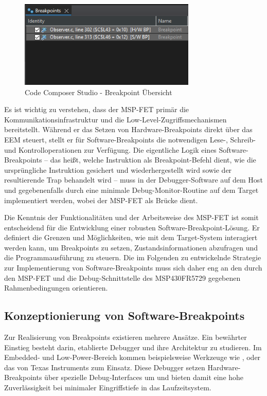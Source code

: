 \begin{figure}[h!]
	\centering
	\includegraphics[width=0.75\textwidth]{../Bilder/HW_SW_Breakpoint.png}
	\caption{Code Composer Studio - Breakpoint \"Ubersicht}
	\label{fig:CCS_SetBR}
\end{figure}

Es ist wichtig zu verstehen, dass der MSP-FET prim\"ar die Kommunikationsinfrastruktur und die Low-Level-Zugriffsmechanismen bereitstellt. W\"ahrend er das Setzen von Hardware-Breakpoints direkt \"uber das EEM steuert, stellt er f\"ur Software-Breakpoints die notwendigen Lese-, Schreib- und Kontrolloperationen zur Verf\"ugung. Die eigentliche Logik eines Software-Breakpoints – das hei{\ss}t, welche Instruktion als Breakpoint-Befehl dient, wie die urspr\"ungliche Instruktion gesichert und wiederhergestellt wird sowie der resultierende Trap behandelt wird – muss in der Debugger-Software auf dem Host und gegebenenfalls durch eine minimale Debug-Monitor-Routine auf dem Target implementiert werden, wobei der MSP-FET als Br\"ucke dient. 

Die Kenntnis der Funktionalit\"aten und der Arbeitsweise des MSP-FET ist somit entscheidend f\"ur die Entwicklung einer robusten Software-Breakpoint-L\"osung. Er definiert die Grenzen und M\"oglichkeiten, wie mit dem Target-System interagiert werden kann, um Breakpoints zu setzen, Zustandsinformationen abzufragen und die Programmausf\"uhrung zu steuern. Die im Folgenden zu entwickelnde Strategie zur Implementierung von Software-Breakpoints muss sich daher eng an den durch den MSP-FET und die Debug-Schnittstelle des MSP430FR5729 gegebenen Rahmenbedingungen orientieren.

\newpage
\subsection{Konzeptionierung von Software-Breakpoints}
\label{sec:KonzeptionierungSoftwareBreakpoints}

Zur Realisierung von Breakpoints existieren mehrere Ans\"atze. Ein bew\"ahrter Einstieg besteht darin, etablierte Debugger und ihre Architektur zu studieren. Im Embedded‑ und Low‑Power‑Bereich kommen beispielsweise Werkzeuge wie ,  oder das  von Texas Instruments zum Einsatz. Diese Debugger setzen Hardware-Breakpoints \"uber spezielle Debug‑Interfaces um und bieten damit eine hohe Zuverl\"assigkeit bei minimaler Eingriffstiefe in das Laufzeitsystem.

